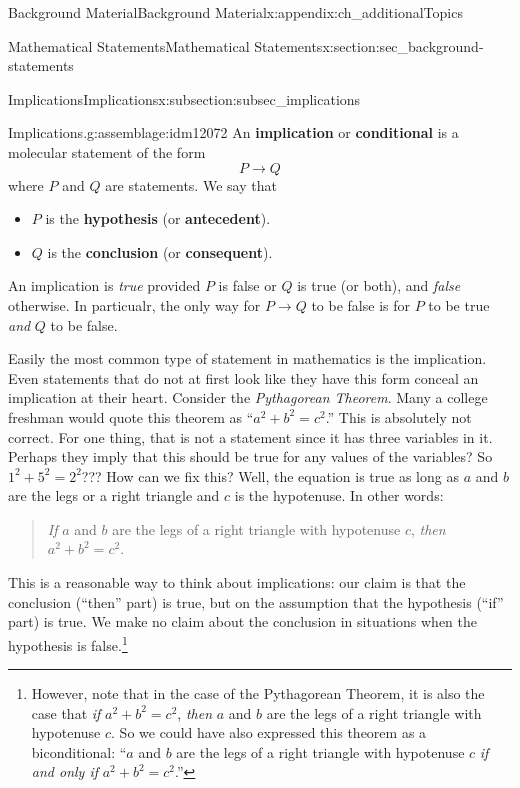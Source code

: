 \documentclass[oneside,10pt,]{book}
\newcommand{\terminology}[1]{\textbf{#1}}
\numberwithin{equation}{chapter}
\def\imp{\rightarrow}
\begin{document}
\begin{appendixptx}{Background Material}{}{Background Material}{}{}{x:appendix:ch_additionalTopics}
\begin{sectionptx}{Mathematical Statements}{}{Mathematical Statements}{}{}{x:section:sec_background-statements}
%
%
\typeout{************************************************}
\typeout{************************************************}
%
\begin{subsectionptx}{Implications}{}{Implications}{}{}{x:subsection:subsec_implications}
\begin{assemblage}{Implications.}{g:assemblage:idm12072}%
An \terminology{implication} or \terminology{conditional} is a molecular statement of the form%
\begin{equation*}
P \imp Q
\end{equation*}
where \(P\) and \(Q\) are statements.  We say that%
\begin{itemize}[label=\textbullet]
\item{}\(P\) is the \terminology{hypothesis} (or \terminology{antecedent}).%
\item{}\(Q\) is the \terminology{conclusion} (or \terminology{consequent}).%
\end{itemize}
%
\par
An implication is \emph{true} provided \(P\) is false or  \(Q\) is true (or both), and \emph{false} otherwise.  In particualr, the only way for \(P \imp Q\) to be false is for \(P\) to be true \emph{and} \(Q\) to be false.%
\end{assemblage}
Easily the most common type of statement in mathematics is the implication. Even statements that do not at first look like they have this form conceal an implication at their heart. Consider the \emph{Pythagorean Theorem}. Many a college freshman would quote this theorem as ``\(a^2 + b^2 = c^2\).'' This is absolutely not correct. For one thing, that is not a statement since it has three variables in it. Perhaps they imply that this should be true for any values of the variables?  So \(1^2 + 5^2 = 2^2\)??? How can we fix this? Well, the equation is true as long as \(a\) and \(b\) are the legs or a right triangle and \(c\) is the hypotenuse. In other words:%
\begin{quote}%
\emph{If} \(a\) and \(b\) are the legs of a right triangle with hypotenuse \(c\), \emph{then} \(a^2 + b^2 = c^2\).%
\end{quote}
This is a reasonable way to think about implications: our claim is that the conclusion (``then'' part) is true, but on the assumption that the hypothesis (``if'' part) is true. We make no claim about the conclusion in situations when the hypothesis is false.\footnote{However, note that in the case of the Pythagorean Theorem, it is also the case that \emph{if} \(a^2 + b^2 = c^2\), \emph{then} \(a\) and \(b\) are the legs of a right triangle with hypotenuse \(c\).  So we could have also expressed this theorem as a biconditional: ``\(a\) and \(b\) are the legs of a right triangle with hypotenuse \(c\) \emph{if and only if} \(a^2 + b^2 = c^2\).''\label{g:fn:idm12121}}%

\end{subsectionptx}
\end{sectionptx}
\end{appendixptx}
\end{document}
